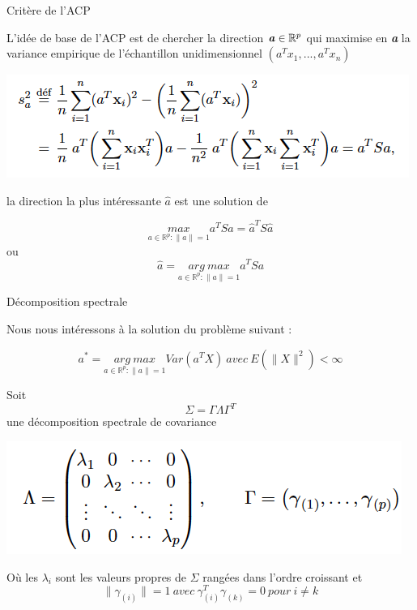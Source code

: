 \documentclass[10pt]{beamer}
\begin{document}
\begin{frame}{ Critère de l'ACP}

L’idée de base de l’ACP est de chercher la direction  $\textbf{\textit{a}} \in \mathbb{R}^p$ qui maximise en \textit{\textbf{a}} la variance empirique de l’échantillon unidimensionnel $(a^T x_1, . . . ,a^T x_n)$


\centering
\includegraphics[scale=0.6]{Sa.png} 

la direction la plus intéressante $\hat{a}$ est une solution de 

$$\underset{a \in \mathbb{R}^p : \parallel a \parallel=1}{max}    a^TSa=\hat{a}^TS\hat{a} $$
ou 
$$ \hat{a}=\underset{a \in \mathbb{R}^p : \parallel a \parallel=1}{arg \ max} a^T Sa $$

\end{frame}


\begin{frame}{Décomposition spectrale}

Nous nous intéressons à la solution du problème suivant : 

$$ a^*=\underset{a \in \mathbb{R}^p : \parallel a \parallel=1}{arg \ max} Var (a^TX) \ avec \  E(\parallel X \parallel^2)<\infty$$

Soit $$ \Sigma =\Gamma \Lambda \Gamma^T $$ une décomposition spectrale de covariance 
 
\centering
\includegraphics[scale=.4]{Decomp.png} 

Où les $\lambda_i$ sont les valeurs propres de $\Sigma$ rangées dans l'ordre croissant et  $$ \parallel \gamma_{(i)}  \parallel=1    \  avec \   \gamma_{(i)}^T \gamma_{(k)}=0 \  pour \  i \neq k $$ 

\end{frame}
\end{document}
